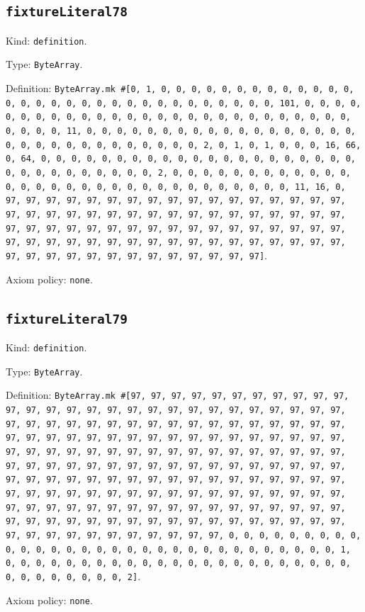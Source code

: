 \documentclass[11pt]{article}
\begin{document}
\subsection*{\texttt{fixtureLiteral78}}
\noindent Kind: \texttt{definition}.\par
\noindent Type: \texttt{ByteArray}.\par
\noindent Definition: \texttt{ByteArray.mk \#[0, 1, 0, 0, 0, 0, 0, 0, 0, 0, 0, 0, 0, 0, 0, 0, 0, 0, 0, 0, 0, 0, 0, 0, 0, 0, 0, 0, 0, 0, 0, 0, 0, 101, 0, 0, 0, 0, 0, 0, 0, 0, 0, 0, 0, 0, 0, 0, 0, 0, 0, 0, 0, 0, 0, 0, 0, 0, 0, 0, 0, 0, 0, 0, 0, 11, 0, 0, 0, 0, 0, 0, 0, 0, 0, 0, 0, 0, 0, 0, 0, 0, 0, 0, 0, 0, 0, 0, 0, 0, 0, 0, 0, 0, 0, 0, 0, 2, 0, 1, 0, 1, 0, 0, 0, 16, 66, 0, 64, 0, 0, 0, 0, 0, 0, 0, 0, 0, 0, 0, 0, 0, 0, 0, 0, 0, 0, 0, 0, 0, 0, 0, 0, 0, 0, 0, 0, 0, 0, 0, 2, 0, 0, 0, 0, 0, 0, 0, 0, 0, 0, 0, 0, 0, 0, 0, 0, 0, 0, 0, 0, 0, 0, 0, 0, 0, 0, 0, 0, 0, 0, 0, 11, 16, 0, 97, 97, 97, 97, 97, 97, 97, 97, 97, 97, 97, 97, 97, 97, 97, 97, 97, 97, 97, 97, 97, 97, 97, 97, 97, 97, 97, 97, 97, 97, 97, 97, 97, 97, 97, 97, 97, 97, 97, 97, 97, 97, 97, 97, 97, 97, 97, 97, 97, 97, 97, 97, 97, 97, 97, 97, 97, 97, 97, 97, 97, 97, 97, 97, 97, 97, 97, 97, 97, 97, 97, 97, 97, 97, 97, 97, 97, 97, 97, 97, 97]}.\par
\noindent Axiom policy: \texttt{none}.\par
\subsection*{\texttt{fixtureLiteral79}}
\noindent Kind: \texttt{definition}.\par
\noindent Type: \texttt{ByteArray}.\par
\noindent Definition: \texttt{ByteArray.mk \#[97, 97, 97, 97, 97, 97, 97, 97, 97, 97, 97, 97, 97, 97, 97, 97, 97, 97, 97, 97, 97, 97, 97, 97, 97, 97, 97, 97, 97, 97, 97, 97, 97, 97, 97, 97, 97, 97, 97, 97, 97, 97, 97, 97, 97, 97, 97, 97, 97, 97, 97, 97, 97, 97, 97, 97, 97, 97, 97, 97, 97, 97, 97, 97, 97, 97, 97, 97, 97, 97, 97, 97, 97, 97, 97, 97, 97, 97, 97, 97, 97, 97, 97, 97, 97, 97, 97, 97, 97, 97, 97, 97, 97, 97, 97, 97, 97, 97, 97, 97, 97, 97, 97, 97, 97, 97, 97, 97, 97, 97, 97, 97, 97, 97, 97, 97, 97, 97, 97, 97, 97, 97, 97, 97, 97, 97, 97, 97, 97, 97, 97, 97, 97, 97, 97, 97, 97, 97, 97, 97, 97, 97, 97, 97, 97, 97, 97, 97, 97, 97, 97, 97, 97, 97, 97, 97, 97, 97, 97, 97, 97, 97, 97, 97, 97, 97, 97, 97, 97, 97, 97, 97, 97, 97, 97, 0, 0, 0, 0, 0, 0, 0, 0, 0, 0, 0, 0, 0, 0, 0, 0, 0, 0, 0, 0, 0, 0, 0, 0, 0, 0, 0, 0, 0, 0, 0, 1, 0, 0, 0, 0, 0, 0, 0, 0, 0, 0, 0, 0, 0, 0, 0, 0, 0, 0, 0, 0, 0, 0, 0, 0, 0, 0, 0, 0, 0, 0, 0, 2]}.\par
\noindent Axiom policy: \texttt{none}.\par
\end{document}
